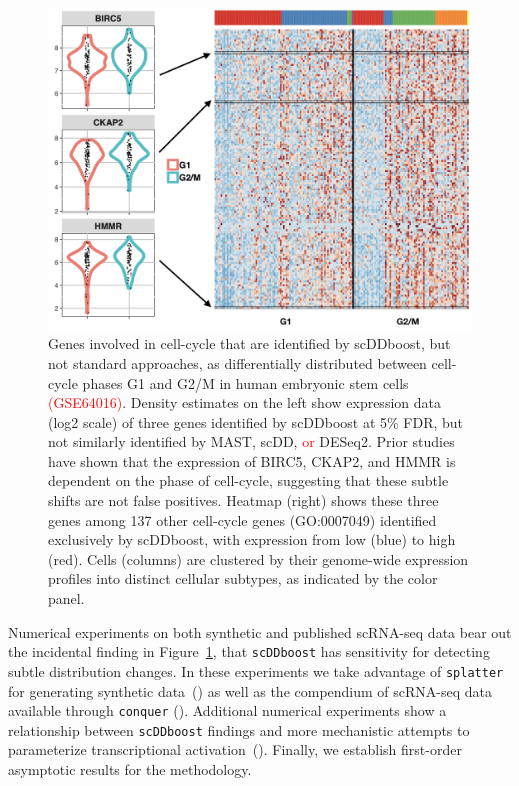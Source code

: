\documentclass[aoas,preprint]{imsart}
\begin{document}
\begin{figure}[H]
\includegraphics[width=\textwidth]{Figs/Fig1.png}

 \caption{Genes involved in cell-cycle that are identified by scDDboost, but not standard approaches,
 as differentially distributed between cell-cycle phases G1 and G2/M in human embryonic stem cells 
\textcolor{red}{(GSE64016)}. 
  Density estimates on the left show expression data (log2 scale)
of three genes identified by scDDboost at 5\% FDR, but not similarly identified by MAST, scDD, \textcolor{red}{or}  DESeq2.
 Prior studies have shown that the expression
 of  BIRC5, CKAP2, and HMMR is dependent on the phase of cell-cycle,
 suggesting that these subtle shifts are not false positives. 
 Heatmap (right) shows these three genes among 137 other cell-cycle genes (GO:0007049) identified
exclusively by scDDboost, with expression from low (blue) to high 
(red).  Cells (columns) are clustered by their genome-wide
expression profiles into distinct cellular subtypes, as indicated by the color panel.}


 \label{fig:whet} 
\end{figure}


Numerical experiments on both synthetic and published scRNA-seq data bear out the incidental finding 
in Figure~\ref{fig:whet}, that \verb+scDDboost+ has sensitivity for detecting subtle distribution changes. 
  In these experiments we take advantage of
\verb+splatter+ for generating synthetic data~(\cite{ref:Zappia}) as well as the compendium of scRNA-seq
data available through \verb+conquer+ (\cite{ref:Cq}).  Additional numerical experiments show a relationship
 between \verb+scDDboost+ findings and more mechanistic attempts to parameterize transcriptional
 activation~(\cite{ref:d3e}).  Finally, we establish first-order asymptotic results for the methodology.  
\end{document}
